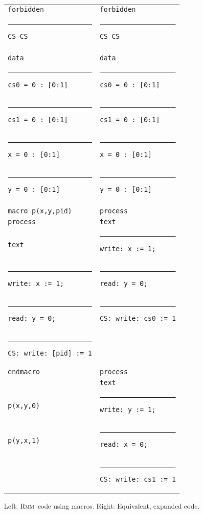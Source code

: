 \documentclass[a4paper]{article}
\newcommand{\rmm}{\textsc{Rmm}}
\begin{document}
\begin{figure}
  \begin{center}
    \begin{tabular}{l|l}
      {\tt forbidden}                            & {\tt forbidden}\\
      \rule{5pt}{0pt}{\tt CS CS}                 & \rule{5pt}{0pt}{\tt CS CS}\\
      \\
      {\tt data}                                       & {\tt data}\\
      \rule{5pt}{0pt}{\tt cs0 = 0 : [0:1]}             & \rule{5pt}{0pt}{\tt cs0 = 0 : [0:1]}\\
      \rule{5pt}{0pt}{\tt cs1 = 0 : [0:1]}             & \rule{5pt}{0pt}{\tt cs1 = 0 : [0:1]}\\
      \rule{5pt}{0pt}{\tt x = 0 \hphantom{s1}: [0:1]}  & \rule{5pt}{0pt}{\tt x = 0 \hphantom{s1}: [0:1]}\\
      \rule{5pt}{0pt}{\tt y = 0 \hphantom{s1}: [0:1]}  & \rule{5pt}{0pt}{\tt y = 0 \hphantom{s1}: [0:1]}\\
      \\
      {\tt macro p(x,y,pid)}                     & {\tt process}\\
      {\tt process}                              & {\tt text}\\
      {\tt text}                                 & \rule{5pt}{0pt}{\tt write: x := 1;}\\
      \rule{5pt}{0pt}{\tt write: x := 1;}        & \rule{5pt}{0pt}{\tt read: y = 0;}\\
      \rule{5pt}{0pt}{\tt read: y = 0;}          & \rule{5pt}{0pt}{\tt CS: write: cs0 := 1}\\
      \rule{5pt}{0pt}{\tt CS: write: [pid] := 1}\\
      {\tt endmacro}                             & {\tt process}\\
                                                 & {\tt text}\\
      {\tt p(x,y,0)}                             & \rule{5pt}{0pt}{\tt write: y := 1;}\\
      {\tt p(y,x,1)}                             & \rule{5pt}{0pt}{\tt read: x = 0;}\\
                                                 &  \rule{5pt}{0pt}{\tt CS: write: cs1 := 1}\\
    \end{tabular}
  \end{center}
  \caption{Left: \rmm\ code using macros. Right: Equivalent, expanded code.}\label{fig:macro:example}
\end{figure}
\end{document}
